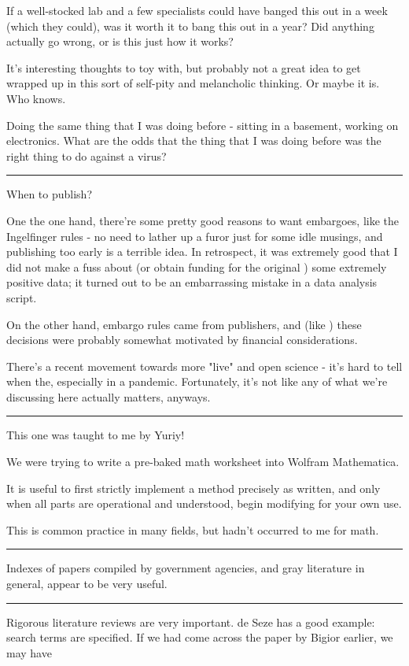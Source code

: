 \documentclass[paper.tex]{subfiles}
\begin{document}
If a well-stocked lab and a few specialists could have banged this out in a week (which they could), was it worth it to bang this out in a year? Did anything actually go wrong, or is this just how it works?

It's interesting thoughts to toy with, but probably not a great idea to get wrapped up in this sort of self-pity and melancholic thinking. Or maybe it is. Who knows.

Doing the same thing that I was doing before - sitting in a basement, working on electronics. What are the odds that the thing that I was doing before was the right thing to do against a virus?

\rule{\linewidth}{0.2pt}

When to publish?

One the one hand, there're some pretty good reasons to want embargoes, like the Ingelfinger rules - no need to lather up a furor just for some idle musings, and publishing too early is a terrible idea. In retrospect, it was extremely good that I did not make a fuss about (or obtain funding for the original ) some extremely positive data; it turned out to be an embarrassing mistake in a data analysis script.

On the other hand, embargo rules came from publishers, and (like ) these decisions were probably somewhat motivated by financial considerations.

There's a recent movement towards more "live" and open science - it's hard to tell when the, especially in a pandemic. Fortunately, it's not like any of what we're discussing here actually matters, anyways.

\rule{\linewidth}{0.2pt}

This one was taught to me by Yuriy!

We were trying to write a pre-baked math worksheet into Wolfram Mathematica.

It is useful to first strictly implement a method precisely as written, and only when all parts are operational and understood, begin modifying for your own use.

This is common practice in many fields, but hadn't occurred to me for math. 

\rule{\linewidth}{0.2pt}

Indexes of papers compiled by government agencies, and gray literature in general, appear to be very useful.

\rule{\linewidth}{0.2pt}

Rigorous literature reviews are very important. de Seze has a good example: search terms are specified. If we had come across the paper by Bigior earlier, we may have
\end{document}
